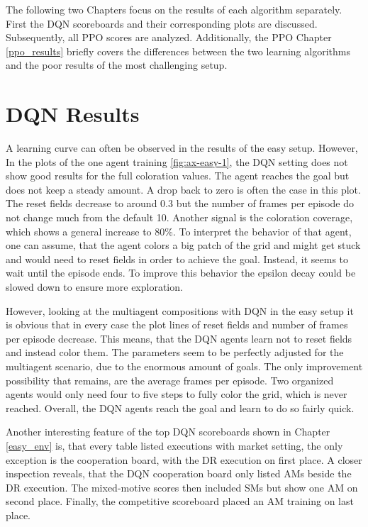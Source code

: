 The following two Chapters focus on the results of each algorithm separately. First the DQN scoreboards and their corresponding plots are discussed. Subsequently, all PPO scores are analyzed. Additionally, the PPO Chapter \ref{ppo_results} briefly covers the differences between the two learning algorithms and the poor results of the most challenging setup.

\section{DQN Results}
A learning curve can often be observed in the results of the easy setup. However, In the plots of the one agent training \ref{fig:ax-easy-1}, the DQN setting does not show good results for the full coloration values. The agent reaches the goal but does not keep a steady amount. A drop back to zero is often the case in this plot. The reset fields decrease to around 0.3 but the number of frames per episode do not change much from the default 10. Another signal is the coloration coverage, which shows a general increase to 80\%. To interpret the behavior of that agent, one can assume, that the agent colors a big patch of the grid and might get stuck and would need to reset fields in order to achieve the goal. Instead, it seems to wait until the episode ends. To improve this behavior the epsilon decay could be slowed down to ensure more exploration.

However, looking at the multiagent compositions with DQN in the easy setup it is obvious that in every case the plot lines of reset fields and number of frames per episode decrease. This means, that the DQN agents learn not to reset fields and instead color them. The parameters seem to be perfectly adjusted for the multiagent scenario, due to the enormous amount of goals. The only improvement possibility that remains, are the average frames per episode. Two organized agents would only need four to five steps to fully color the grid, which is never reached. Overall, the DQN agents reach the goal and learn to do so fairly quick. 

Another interesting feature of the top DQN scoreboards shown in Chapter \ref{easy_env} is, that every table listed executions with market setting, the only exception is the cooperation board, with the DR execution on first place. A closer inspection reveals, that the DQN cooperation board only listed AMs beside the DR execution. The mixed-motive scores then included SMs but show one AM on second place. Finally, the competitive scoreboard placed an AM training on last place.

